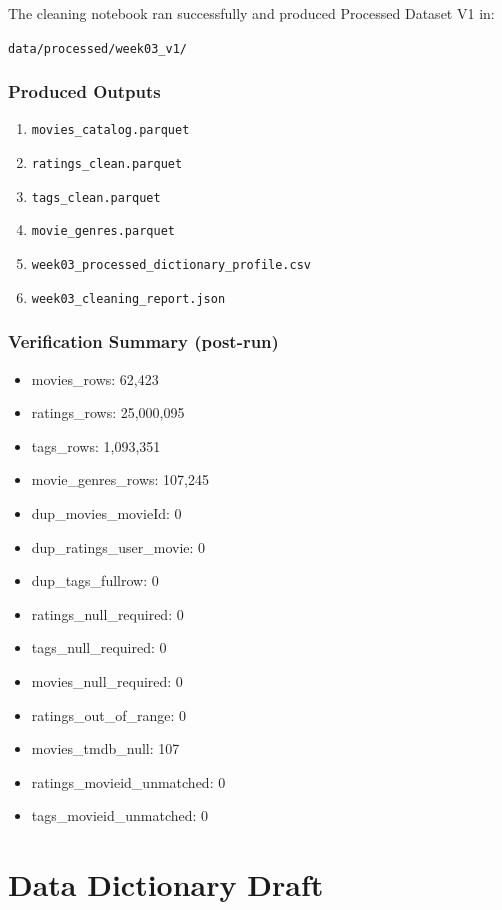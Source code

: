 \documentclass[11pt]{article}
\begin{document}
The cleaning notebook ran successfully and produced Processed Dataset V1 in:

\texttt{data/processed/week03\_v1/}

\subsubsection*{Produced Outputs}

\begin{enumerate}[leftmargin=1.5em]
    \item \texttt{movies\_catalog.parquet}
    \item \texttt{ratings\_clean.parquet}
    \item \texttt{tags\_clean.parquet}
    \item \texttt{movie\_genres.parquet}
    \item \texttt{week03\_processed\_dictionary\_profile.csv}
    \item \texttt{week03\_cleaning\_report.json}
\end{enumerate}

\subsubsection*{Verification Summary (post-run)}

\begin{itemize}[leftmargin=1.5em]
    \item movies\_rows: 62,423
    \item ratings\_rows: 25,000,095
    \item tags\_rows: 1,093,351
    \item movie\_genres\_rows: 107,245
    \item dup\_movies\_movieId: 0
    \item dup\_ratings\_user\_movie: 0
    \item dup\_tags\_fullrow: 0
    \item ratings\_null\_required: 0
    \item tags\_null\_required: 0
    \item movies\_null\_required: 0
    \item ratings\_out\_of\_range: 0
    \item movies\_tmdb\_null: 107
    \item ratings\_movieid\_unmatched: 0
    \item tags\_movieid\_unmatched: 0
\end{itemize}

\section{Data Dictionary Draft}
\end{document}
